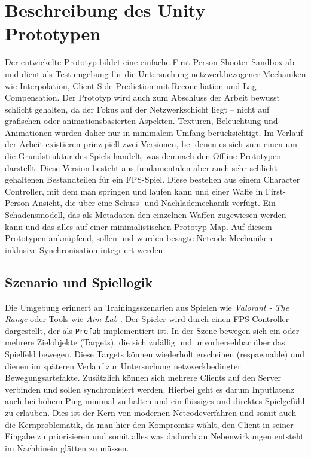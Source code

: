 \chapter{Beschreibung des Unity Prototypen}
\label{chapter_3}

Der entwickelte Prototyp  bildet eine einfache First-Person-Shooter-Sandbox ab und dient als Testumgebung für die Untersuchung netzwerkbezogener Mechaniken wie Interpolation, Client-Side Prediction mit Reconciliation und Lag Compensation. Der Prototyp wird auch zum Abschluss der Arbeit bewusst schlicht gehalten, da der Fokus auf der Netzwerkschicht liegt – nicht auf grafischen oder animationsbasierten Aspekten. Texturen, Beleuchtung und Animationen wurden daher nur in minimalem Umfang berücksichtigt.
Im Verlauf der Arbeit existieren prinzipiell zwei Versionen, bei denen es sich zum einen um die Grundstruktur des Spiels handelt, was demnach den Offline-Prototypen darstellt. Diese Version besteht aus fundamentalen aber auch sehr schlicht gehaltenen Bestandteilen für ein FPS-Spiel. Diese bestehen aus einem Character Controller, mit dem man springen und laufen kann und einer Waffe in First-Person-Ansicht, die über eine Schuss- und Nachlademechanik verfügt. 
Ein Schadensmodell, das als Metadaten den einzelnen Waffen zugewiesen werden kann und das alles auf einer minimalistischen Prototyp-Map.
Auf diesem Prototypen anknüpfend, sollen und wurden besagte Netcode-Mechaniken inklusive Synchronisation integriert werden.   

\newpage
\section{Szenario und Spiellogik}
Die Umgebung erinnert an Trainingsszenarien aus Spielen wie \textit{Valorant - The Range} \cite{Range} oder Tools wie \textit{Aim Lab} \cite{aimlabs}. Der Spieler wird durch einen FPS-Controller dargestellt, der als \texttt{Prefab} implementiert ist. In der Szene bewegen sich ein oder mehrere Zielobjekte (Targets), die sich zufällig und unvorhersehbar über das Spielfeld bewegen. Diese Targets können wiederholt erscheinen (respawnable) und dienen im späteren Verlauf zur Untersuchung netzwerkbedingter Bewegungsartefakte.
Zusätzlich können sich mehrere Clients auf den Server verbinden und sollen synchronisiert werden. Hierbei geht es darum Inputlatenz auch bei hohem Ping minimal zu halten und ein flüssiges und direktes Spielgefühl zu erlauben. Dies ist der Kern von modernen Netcodeverfahren und somit auch die Kernproblematik, da man hier den Kompromiss wählt, den Client in seiner Eingabe zu priorisieren und somit alles was dadurch an Nebenwirkungen entsteht im Nachhinein glätten zu müssen.

